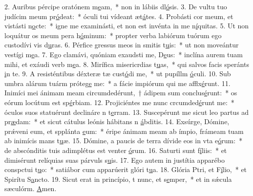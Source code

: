 2. Auribus pércipe oratónem m\uline{e}am,~* non in lábiis dl\uline{ó}sis.
3. De vultu tuo judícim meum pr\uline{ó}deat:~* óculi tui vídeant æt\uline{á}tes.
4. Probásti cor meum, et vistásti n\uline{o}cte:~* igne me examinásti, et non est invénta in me n\uline{í}quitas.
5. Ut non loquátur os meum pera h\uline{ó}minum:~* propter verba labiórum tuórum ego custodívi vis d\uline{u}ras.
6. Pérfice gressus meos in smitis t\uline{u}is:~* ut non moveántur vestígi m\uline{e}a.
7. Ego clamávi, quóniam exaudsti me, D\uline{e}us:~* inclína aurem tuam mihi, et exáudi verb m\uline{e}a.
8. Mirífica misericrdias t\uline{u}as,~* qui salvos facis speránts \uline{i}n te.
9. A resisténtibus déxteræ tæ cust\uline{ó}di me,~* ut pupíllm \uline{ó}culi.
10. Sub umbra alárum tuárm próteg\uline{e} me:~* a fácie impiórum qui me afflx\uline{é}runt.
11. Inimíci mei ánimam meam circumdedérunt,~† ádipem sum conclus\uline{é}runt:~* os eórum locútum est sp\uline{é}rbiam.
12. Projiciéntes me nunc crcumded\uline{é}runt me:~* óculos suos statuérunt declináre n t\uline{e}rram.
13. Suscepérunt me sicut leo partus ad pr\uline{æ}dam:~* et sicut cátulus leónis hábitans n \uline{á}bditis.
14. Exsúrge, Dómine, prǽveni eum, et spplánta \uline{e}um:~* éripe ánimam meam ab ímpio, frámeam tuam ab inimícis mans t\uline{u}æ.
15. Dómine, a paucis de terra dívide eos in vta e\uline{ó}rum:~* de abscónditis tuis adimplétus est venter \uline{ó}rum.
16. Saturti sunt f\uline{í}liis:~* et dimisérunt relíquias suas párvuls s\uline{u}is.
17. Ego autem in justítia apparébo conspctui t\uline{u}o:~* satiábor cum apparúerit glóri t\uline{u}a.
18. Glória Ptri, et F\uline{í}lio,~* et Spirítu S\uline{a}ncto.
19. Sicut erat in princípio, t nunc, et s\uline{e}mper,~* et in sǽcula sæculórm. \uline{A}men.
